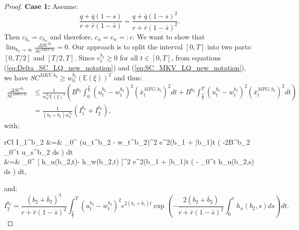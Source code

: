 \documentclass[11pt]{article}
\begin{document}
\begin{proof}
	\textbf{Case 1:} Assume:
	\begin{equation*}
	\frac{q+\bar{q}(1-s)}{r+\bar{r}(1-\bar{s})}=\frac{q+\bar{q}(1-s)^2}{r+\bar{r}(1-\bar{s})^2}.
	\end{equation*}
	Then $c_{\delta_u}=c_{\delta_w}$ and therefore, $c_u = c_w =: c$. 
	We want to show that $\lim_{b_2 \to \infty} \frac{\Delta SC^{b_2}}{SC^{MKV,b_2}} = 0$. Our approach is to split the interval $[0,T]$ into two parts: $[0,T/2]$ and $[T/2,T]$.	
	Since $v^{b_2}_t \geq 0$ for all $t\in [0,T]$, from equations (\ref{eq:Delta_SC_LQ_new_notation}) and (\ref{eq:SC_MKV_LQ_new_notation}), we have $SC^{MKV,b_2} \geq w_0^{b_2} (\mathbb{E}(\xi))^2$ and thus:
	\begin{equation}
	\begin{split}
		\frac{\Delta SC^{b_2}}{SC^{MKV,b_2}} &\leq \frac{1}{w_0^{b_2} \mathbb{E}(\xi)^2 } \left( B^{b_2} \int_{0}^{\frac{T}{2}} (u_t^{b_2} - w_t^{b_2})^2 (\bar{x}_t^{MFG,b_2})^2 dt + B^{b_2} \int_{\frac{T}{2}}^{T} (u_t^{b_2} - w_t^{b_2})^2 (\bar{x}_t^{MFG,b_2})^2 dt \right) \\ 
		&=  \frac{1}{(b_2 + \bar{b}_2) w_0^{b_2} } \left( I_1^{b_2} + I_2^{b_2} \right),
	\end{split}
	\label{eq:I_1_plus_I_2}
	\end{equation}
	with:
	\begin{IEEEeqnarray*}{rCl}
	I_1^{b_2} &=&   \int_0^{} (u_t^{b_2} - w_t^{b_2})^2 e^{2(b_1 + \bar{b}_1)t} \exp \left( -2B^{b_2} \int_0^{t} u_s^{b_2} ds 
	\right) dt \\
	&=&  \int_0^{} [ h_u(b_2,t)- h_w(b_2,t) ]^2 \cdot e^{2(b_1 + \bar{b}_1)t} \exp \left( -   \int_0^t h_u(b_2,s) ds \right) dt, 
	\end{IEEEeqnarray*}
	and:
	$$
		I_2^{b_2} = \frac{(b_2 + \bar{b}_2)^3}{r + \bar{r}(1-\bar{s})^2}  \int_{\frac{T}{2}}^T (u_t^{b_2} - w_t^{b_2})^2 e^{2(b_1 + \bar{b}_1)t} \exp \left( -\frac{2 (b_2 + \bar{b}_2)}{r + \bar{r}(1-\bar{s})^2} \int_0^{t} h_u(b_2,s) ds \right) dt.
	$$
	

\end{proof}
\end{document}
